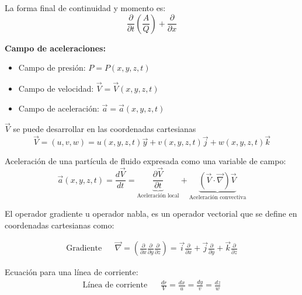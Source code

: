La forma final de continuidad y momento es:
\begin{equation}
    \frac{\partial }{\partial t} \left(\frac{A}{Q}  \right) + \frac{\partial }{\partial x} 
\end{equation}


\textbf{Campo de aceleraciones:}
\begin{itemize}
    \item Campo de presión: $P=P(x,y,z,t)$
    \item Campo de velocidad: $\vec{V}= \vec{V}(x,y,z,t)$
    \item Campo de aceleración: $\vec{a}= \vec{a}(x,y,z,t)$
\end{itemize}
$\vec{V}$ se puede desarrollar en las coordenadas cartesianas 
\begin{equation}
    \vec{V} = (u,v,w) = u(x,y,z,t)\vec{y} + v(x,y,z,t)\vec{j} + w(x,y,z,t)\vec{k}
\end{equation}


Aceleración de una partícula de fluido expresada como una variable de campo:
\begin{equation}
\vec{a}\left(x,y,z,t\right) = \frac{d\vec{V}}{dt} = \underbrace{\frac{\partial \vec{V}}{\partial t}}_{\text{Aceleración local}} + \underbrace{\left(\vec{V} \cdot \vec{\nabla}\right)\vec{V}}_{\text{Aceleración convectiva}}
\end{equation}


El operador gradiente u operador nabla, es un operador vectorial que se define en coordenadas cartesianas como:

\begin{align}
    \text{Gradiente}&& \vec{\nabla} = \left( \frac{\partial}{\partial x} \frac{\partial}{\partial y} \frac{\partial}{\partial z}    \right) = \vec{i} \frac{\partial }{\partial x} + \vec{j} \frac{\partial}{\partial y} + \vec{k} \frac{\partial}{\partial z} 
\end{align}




Ecuación para una línea de corriente:
\begin{align}
    \text{Línea de corriente}&& \frac{dr}{V} = \frac{dx}{u} = \frac{dy}{v} = \frac{dz}{w}
\end{align}



